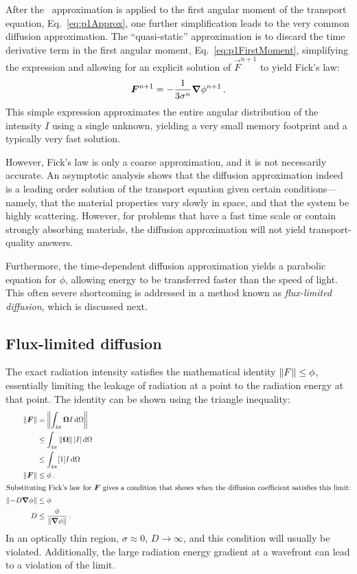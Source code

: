 After the \Pone\ approximation is applied to the first angular moment of the
transport equation, Eq.~\eqref{eq:p1Approx}, one further simplification leads to
the very common diffusion approximation. The ``quasi-static'' \cite{Dud1976}
approximation is to discard the time derivative term in the first angular moment,
Eq.~\eqref{eq:p1FirstMoment}, simplifying the expression and allowing for an
explicit solution of $\vec{F}^{n+1}$ to yield Fick's law:
\begin{equation*}
  \bm{F}^{n+1} = - \frac{1}{3\sigma^n} \bm{\nabla} \phi^{n+1}\,.
\end{equation*}
This simple expression approximates the entire angular distribution of the
intensity $I$ using a single unknown, yielding a very small memory footprint and
a typically very fast solution.

However, Fick's law is only a coarse approximation, and it is not
necessarily accurate. An asymptotic analysis \cite{Lar1975,Lar1983a} shows that
the diffusion approximation indeed is a leading
order solution of the transport equation given certain conditions---%
namely, that the material properties vary slowly in space, and that the
system be highly scattering. However, for problems that have a fast time scale
or contain strongly absorbing materials, the diffusion approximation will not
yield transport-quality answers.

Furthermore, the time-dependent diffusion approximation yields a parabolic equation
for $\phi$, allowing energy to be transferred faster than the speed of light. This
often severe shortcoming is addressed in a method known as \emph{flux-limited
diffusion}, which is discussed next.

\subsection{Flux-limited diffusion}\label{sec:bgFld}

The exact radiation intensity satisfies the mathematical identity $\left\| F \right\| \le
\phi$,
essentially limiting the leakage of radiation at a point to the radiation
energy at that point. The identity can be shown using the triangle inequality:
\begin{align}
  \left\| \bm{F} \right\| &= \left\|  \int_{4\pi} \bm{\Omega} I \mathop{}\!\mathrm{d} \Omega \right\|
  \\ \nonumber
  &\le \int_{4\pi} \left\| \bm{\Omega} \right\| \left| I \right| \mathop{}\!\mathrm{d} \Omega 
  \\ \nonumber
  &\le \int_{4\pi} [1] I \mathop{}\!\mathrm{d}\Omega
  \\ \label{eq:fluxLimit}
  \left\| \bm{F} \right\| &\le \phi\,.
  \\ 
  \intertext{Substituting Fick's law for $\bm{F}$ gives a condition that
  shows when the
  diffusion coefficient satisfies this limit:} \nonumber
  \left\| - D \bm{\nabla} \phi \right\| &\le \phi
  \\ \label{eq:fluxLimitDiffusion}
  D & \le \frac{\phi}{\left\| \bm{\nabla} \phi \right\|} \,.
\end{align}
In an optically thin region, $\sigma\approx 0$, $D\to\infty$, and this condition
will usually be violated. Additionally, the large radiation energy gradient at a
wavefront can lead to a violation of the limit.

